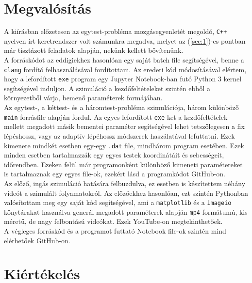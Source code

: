 \begin{multicols}{2}
\section{Megvalósítás} \label{sec:3}
A kiírásban előzetesen az egytest-probléma mozgásegyenletét megoldó, \texttt{C++} nyelven írt keretrendszer volt számunkra megadva, melyet az (\ref{sec:1})-es pontban már tisztázott feladatok alapján, nekünk kellett bővítenünk. \\
A forráskódot az eddigiekhez hasonlóan egy saját batch file segítségével, benne a \texttt{clang} fordító felhasználásával fordítottam. Az eredeti kód módosításával elértem, hogy a lefordított \texttt{exe} program egy Jupyter Notebook-ban futó Python 3 kernel segítségével induljon. A szimuláció a kezdőfeltételeket szintén ebből a környezetből várja, bemenő paraméterek formájában. \\
Az egytest-, a kéttest- és a háromtest-probléma szimulációja, három különböző \texttt{main} forrásfile alapján fordul. Az egyes lefordított \texttt{exe}-ket a kezdőfeltételek mellett megadott másik bementei paraméter segítségével lehet tetszőlegesen a fix lépéshossz, vagy az adaptív lépéhossz módszerek haszálatával lefuttatni. Ezek kimenete mindkét esetben egy-egy \texttt{.dat} file, mindhárom program esetében. Ezek minden esetben tartalmazzák egy egyes testek koordinátáit és sebességeit, időrendben. Ezeken felül már programonként különböző kimeneti paramétereket is tartalmaznak egy egyes file-ok, ezekért lásd a programkódot GitHub-on\cite{github}. \\
Az előző, ingás szimuláció hatására felbuzdulva, ez esetben is készítettem néhány videót a szimulált folyamatokról. Az előzőekhez hasonlóan, ezt szintén Pythonban valósítottam meg egy saját kód segítségével, ami a \texttt{matplotlib} és a \texttt{imageio} könytárakat használva generál megadott paraméterek alapján \texttt{mp4} formátumú, kis méretű, de nagy felbontású videókat. Ezek YouTube-on megtekinthetőek\cite{yt}. \\
A végleges forráskód és a programot futtató Notebook file-ok szintén mind elérhetőek GitHub-on\cite{github}.

\section{Kiértékelés} \label{sec:4}

\end{multicols}
